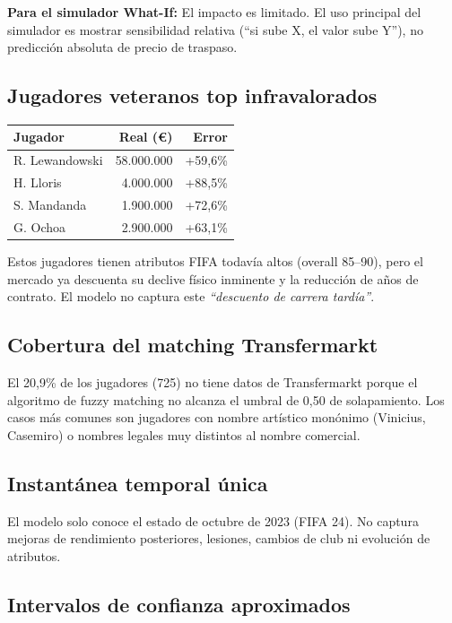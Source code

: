 \documentclass[12pt,a4paper]{report}
\begin{document}
\textbf{Para el simulador What-If:} El impacto es limitado. El uso principal del simulador es mostrar sensibilidad relativa (``si sube X, el valor sube Y''), no predicción absoluta de precio de traspaso.

\subsection{Jugadores veteranos top infravalorados}

\begin{center}
\begin{tabular}{lrr}
\toprule
\textbf{Jugador} & \textbf{Real (€)} & \textbf{Error} \\
\midrule
R. Lewandowski & 58.000.000 & +59{,}6\% \\
H. Lloris      &  4.000.000 & +88{,}5\% \\
S. Mandanda    &  1.900.000 & +72{,}6\% \\
G. Ochoa       &  2.900.000 & +63{,}1\% \\
\bottomrule
\end{tabular}
\end{center}

Estos jugadores tienen atributos FIFA todavía altos (overall 85--90), pero el mercado ya descuenta su declive físico inminente y la reducción de años de contrato. El modelo no captura este \textit{``descuento de carrera tardía''}.

\subsection{Cobertura del matching Transfermarkt}

El 20{,}9\% de los jugadores (725) no tiene datos de Transfermarkt porque el algoritmo de fuzzy matching no alcanza el umbral de 0{,}50 de solapamiento. Los casos más comunes son jugadores con nombre artístico monónimo (Vinicius, Casemiro) o nombres legales muy distintos al nombre comercial.

\subsection{Instantánea temporal única}

El modelo solo conoce el estado de octubre de 2023 (FIFA 24). No captura mejoras de rendimiento posteriores, lesiones, cambios de club ni evolución de atributos.

\subsection{Intervalos de confianza aproximados}
\end{document}

